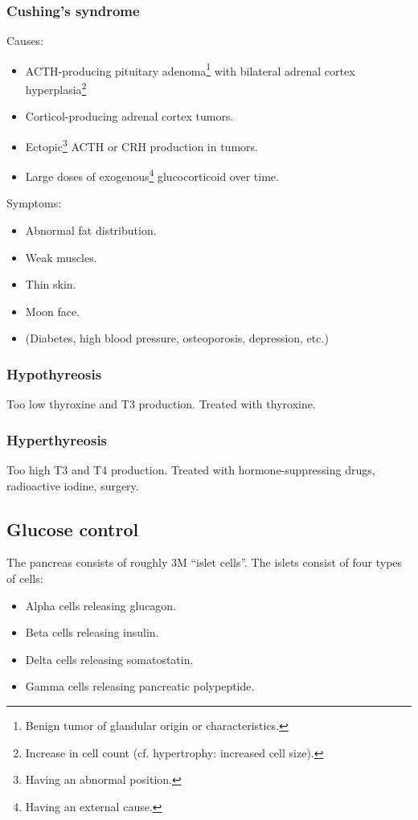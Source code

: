\subsubsection{Cushing's syndrome}
Causes:
\begin{itemize}
  \item ACTH-producing pituitary adenoma\footnote{Benign tumor of glandular origin or characteristics.} with bilateral adrenal cortex hyperplasia\footnote{Increase in cell count (cf. hypertrophy: increased cell size).}
  \item Corticol-producing adrenal cortex tumors.
  \item Ectopic\footnote{Having an abnormal position.} ACTH or CRH production in tumors.
  \item Large doses of exogenous\footnote{Having an external cause.} glucocorticoid over time.
\end{itemize}

Symptoms:
\begin{itemize}
  \item Abnormal fat distribution.
  \item Weak muscles.
  \item Thin skin.
  \item Moon face.
  \item (Diabetes, high blood pressure, osteoporosis, depression, etc.)
\end{itemize}

\subsubsection{Hypothyreosis}
Too low thyroxine and T3 production. Treated with thyroxine.

\subsubsection{Hyperthyreosis}
Too high T3 and T4 production. Treated with hormone-suppressing drugs, radioactive iodine, surgery.

\subsection{Glucose control}
The pancreas consists of roughly 3M ``islet cells''. The islets consist of four types of cells:
\begin{itemize}
  \item Alpha cells releasing glucagon.
  \item Beta cells releasing insulin.
  \item Delta cells releasing somatostatin.
  \item Gamma cells releasing pancreatic polypeptide.
\end{itemize}

